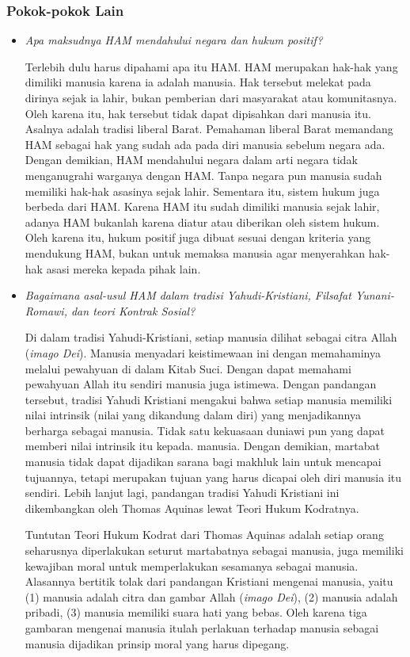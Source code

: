\documentclass[10pt,a4paper]{article}
\begin{document}
\begin{multicols}{2}
\hypertarget{pokok-pokok-lain-3}{%
\subsubsection{Pokok-pokok Lain}\label{pokok-pokok-lain-3}}

\begin{itemize}
\item
  \emph{Apa maksudnya HAM mendahului negara dan hukum positif?}

  Terlebih dulu harus dipahami apa itu HAM. HAM merupakan hak-hak yang
  dimiliki manusia karena ia adalah manusia. Hak tersebut melekat pada
  dirinya sejak ia lahir, bukan pemberian dari masyarakat atau
  komunitasnya. Oleh karena itu, hak tersebut tidak dapat dipisahkan
  dari manusia itu. Asalnya adalah tradisi liberal Barat. Pemahaman
  liberal Barat memandang HAM sebagai hak yang sudah ada pada diri
  manusia sebelum negara ada. Dengan demikian, HAM mendahului negara
  dalam arti negara tidak menganugrahi warganya dengan HAM. Tanpa negara
  pun manusia sudah memiliki hak-hak asasinya sejak lahir. Sementara
  itu, sistem hukum juga berbeda dari HAM. Karena HAM itu sudah dimiliki
  manusia sejak lahir, adanya HAM bukanlah karena diatur atau diberikan
  oleh sistem hukum. Oleh karena itu, hukum positif juga dibuat sesuai
  dengan kriteria yang mendukung HAM, bukan untuk memaksa manusia agar
  menyerahkan hak-hak asasi mereka kepada pihak lain.
\item
  \emph{Bagaimana asal-usul HAM dalam tradisi Yahudi-Kristiani, Filsafat
  Yunani-Romawi, dan teori Kontrak Sosial?}

  Di dalam tradisi Yahudi-Kristiani, setiap manusia dilihat sebagai
  citra Allah (\emph{imago Dei}). Manusia menyadari keistimewaan ini
  dengan memahaminya melalui pewahyuan di dalam Kitab Suci. Dengan dapat
  memahami pewahyuan Allah itu sendiri manusia juga istimewa. Dengan
  pandangan tersebut, tradisi Yahudi Kristiani mengakui bahwa setiap
  manusia memiliki nilai intrinsik (nilai yang dikandung dalam diri)
  yang menjadikannya berharga sebagai manusia. Tidak satu kekuasaan
  duniawi pun yang dapat memberi nilai intrinsik itu kepada. manusia.
  Dengan demikian, martabat manusia tidak dapat dijadikan sarana bagi
  makhluk lain untuk mencapai tujuannya, tetapi merupakan tujuan yang
  harus dicapai oleh diri manusia itu sendiri. Lebih lanjut lagi,
  pandangan tradisi Yahudi Kristiani ini dikembangkan oleh Thomas
  Aquinas lewat Teori Hukum Kodratnya.

  Tuntutan Teori Hukum Kodrat dari Thomas Aquinas adalah setiap orang
  seharusnya diperlakukan seturut martabatnya sebagai manusia, juga
  memiliki kewajiban moral untuk memperlakukan sesamanya sebagai
  manusia. Alasannya bertitik tolak dari pandangan Kristiani mengenai
  manusia, yaitu (1) manusia adalah citra dan gambar Allah (\emph{imago
  Dei}), (2) manusia adalah pribadi, (3) manusia memiliki suara hati
  yang bebas. Oleh karena tiga gambaran mengenai manusia itulah
  perlakuan terhadap manusia sebagai manusia dijadikan prinsip moral
  yang harus dipegang.


\end{itemize}
\end{multicols}
\end{document}
